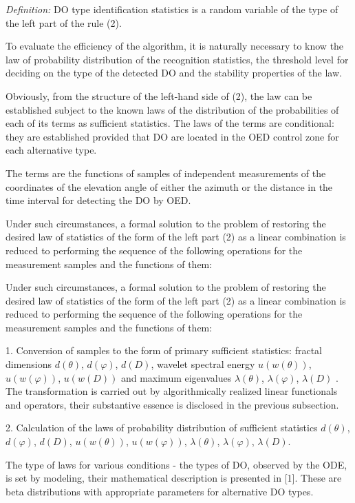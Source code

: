 \textit{Definition:} DO type identification statistics is a random variable of the type of the left part of the rule (2).

To evaluate the efficiency of the algorithm, it is naturally necessary to know the law of probability distribution of the recognition statistics, the threshold level for deciding on the type of the detected DO and the stability properties of the law.

Obviously, from the structure of the left-hand side of (2), the law can be established subject to the known laws of the distribution of the probabilities of each of its terms as sufficient statistics. The laws of the terms are conditional: they are established provided that DO are located in the OED control zone for each alternative type.

The terms are the functions of samples of independent measurements of the coordinates of the elevation angle of either the azimuth or the distance in the time interval for detecting the DO by OED.

Under such circumstances, a formal solution to the problem of restoring the desired law of statistics of the form of the left part (2) as a linear combination is reduced to performing the sequence of the following operations for the measurement samples and the functions of them:

Under such circumstances, a formal solution to the problem of restoring the desired law of statistics of the form of the left part (2) as a linear combination is reduced to performing the sequence of the following operations for the measurement samples and the functions of them:

1. Conversion of samples to the form of primary sufficient statistics: fractal dimensions $d(\theta)$, $d(\varphi)$, $d(D)$, wavelet spectral energy  $ u(w(\theta)) $, $ u(w(\varphi)) $, $ u(w(D)) $ and maximum eigenvalues $ \lambda(\theta) $, $ \lambda(\varphi) $, $ \lambda(D) $  . The transformation is carried out by algorithmically realized linear functionals and operators, their substantive essence is disclosed in the previous subsection.

2. Calculation of the laws of probability distribution of sufficient statistics $d(\theta)$, $d(\varphi)$, $d(D)$, $ u(w(\theta)) $, $ u(w(\varphi)) $,  $ \lambda(\theta) $, $ \lambda(\varphi) $, $ \lambda(D) $.

The type of laws for various conditions - the types of DO, observed by the ODE, is set by modeling, their mathematical description is presented in [1]. These are beta distributions with appropriate parameters for alternative DO types.

